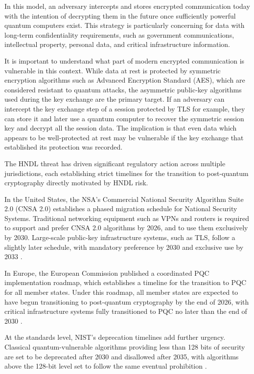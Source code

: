 In this model, an adversary intercepts and stores encrypted communication today with the intention of decrypting them in the future once sufficiently powerful quantum computers exist. This strategy is particularly concerning for data with long-term confidentiality requirements, such as government communications, intellectual property, personal data, and critical infrastructure information. 

It is important to understand what part of modern encrypted communication is vulnerable in this context. While data at rest is protected by symmetric encryption algorithms such as Advanced Encryption Standard (AES), which are considered resistant to quantum attacks, the asymmetric public-key algorithms used during the key exchange are the primary target. If an adversary can intercept the key exchange step of a session protected by TLS for example, they can store it and later use a quantum computer to recover the symmetric session key and decrypt all the session data. The implication is that even data which appears to be well-protected at rest may be vulnerable if the key exchange that established its protection was recorded.

The HNDL threat has driven significant regulatory action across multiple jurisdictions, each establishing strict timelines for the transition to post-quantum cryptography directly motivated by HNDL risk.  

In the United States, the NSA's Commercial National Security Algorithm Suite 2.0 (CNSA 2.0) establishes a phased migration schedule for National Security Systems. Traditional networking equipment such as VPNs and routers is required to support and prefer CNSA 2.0 algorithms by 2026, and to use them exclusively by 2030. Large-scale public-key infrastructure systems, such as TLS, follow a slightly later schedule, with mandatory preference by 2030 and exclusive use by 2033 \cite{NSA2022CNSA2}. 

In Europe, the European Commission published a coordinated PQC implementation roadmap, which establishes a timeline for the transition to PQC for all member states. Under this roadmap, all member states are expected to have begun transitioning to post-quantum cryptography by the end of 2026, with critical infrastructure systems fully transitioned to PQC no later than the end of 2030 \cite{EUPQC2025Roadmap}.

At the standards level, NIST's deprecation timelines add further urgency. Classical quantum-vulnerable algorithms providing less than 128 bits of security are set to be deprecated after 2030 and disallowed after 2035, with algorithms above the 128-bit level set to follow the same eventual prohibition \cite{Moody2025PQCRoadAhead}.

